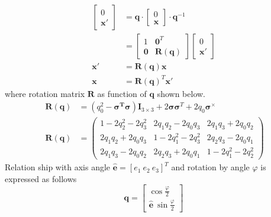 \begin{equation*}
\begin{aligned}
\begin{bmatrix}
0\\
\mathbf{x} '
\end{bmatrix} & =\mathbf{q} \cdot \begin{bmatrix}
0\\
\mathbf{x}
\end{bmatrix} \cdot \mathbf{q}^{-1}\\
 & =\begin{bmatrix}
1 & \mathbf{0}^{T}\\
\mathbf{0} & \mathbf{R}(\mathbf{q})
\end{bmatrix}\begin{bmatrix}
0\\
\mathbf{x} '
\end{bmatrix}\\
\mathbf{x} ' & =\mathbf{R}(\mathbf{q})\mathbf{x}\\
\mathbf{x} & =\mathbf{R}(\mathbf{q})^{T}\mathbf{x} '
\end{aligned}
\end{equation*}
where rotation matrix $\displaystyle \mathbf{R}$ as function of $\displaystyle \mathbf{q}$ shown below.
\begin{equation}
\ \begin{aligned}
\mathbf{R}(\mathbf{q}) & =\left( q^{2}_{0} -\mathbf{\sigma ^{T} \sigma }\right)\mathbf{I}_{3\times 3} +2\mathbf{\sigma \sigma }^{T} +2q_{0}\mathbf{\sigma }^{\times }\\
\mathbf{R}(\mathbf{q}) & =\begin{pmatrix}
1-2q^{2}_{2} -2q^{2}_{3} & 2q_{1} q_{2} -2q_{0} q_{3} & 2q_{1} q_{3} +2q_{0} q_{2}\\
2q_{1} q_{2} +2q_{0} q_{3} & 1-2q^{2}_{1} -2q^{2}_{3} & 2q_{2} q_{3} -2q_{0} q_{1}\\
2q_{1} q_{3} -2q_{0} q_{2} & 2q_{2} q_{3} +2q_{0} q_{1} & 1-2q^{2}_{1} -2q^{2}_{2}
\end{pmatrix}
\end{aligned}
\end{equation}
Relation ship with axis angle $\displaystyle \hat{\mathbf{e}} =[ e_{1} \ e_{2} \ e_{3}]^{T}$ and rotation by angle $\displaystyle \varphi $ is expressed as follows
\begin{equation}
\label{eqn:axisAngle}
\mathbf{q} =\begin{bmatrix}
\cos\frac{\varphi }{2}\\
\hat{\mathbf{e}} \ \sin\frac{\varphi }{2}
\end{bmatrix}
\end{equation}

